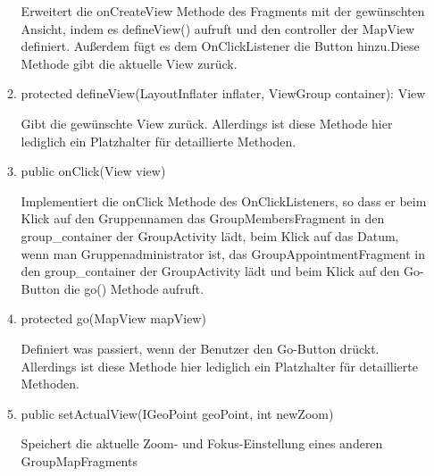 \begin{enumerate}
\begin{enumerate}
		Erweitert die onCreateView Methode des Fragments mit der gewünschten Ansicht, indem es defineView() aufruft und den controller der MapView definiert. Außerdem fügt es dem OnClickListener die Button hinzu.Diese Methode gibt die aktuelle View zurück.
		
		\item protected defineView(LayoutInflater inflater, ViewGroup container): View

		Gibt die gewünschte View zurück. Allerdings ist diese Methode hier lediglich ein Platzhalter für detaillierte Methoden.
		
		\item public onClick(View view)
		
		Implementiert die onClick Methode des OnClickListeners, so dass er beim Klick auf den Gruppennamen das GroupMembersFragment in den group\_container der GroupActivity lädt, beim Klick auf das Datum, wenn man Gruppenadministrator ist, das GroupAppointmentFragment in den group\_container der GroupActivity lädt und beim Klick auf den Go-Button die go() Methode aufruft.
		
		\item protected go(MapView mapView)
		
		Definiert was passiert, wenn der Benutzer den Go-Button drückt. Allerdings ist diese Methode hier lediglich ein Platzhalter für detaillierte Methoden.
		
		\item public setActualView(IGeoPoint geoPoint, int newZoom)
		
		Speichert die aktuelle Zoom- und Fokus-Einstellung eines anderen GroupMapFragments
	\end{enumerate}
	

\end{enumerate}
